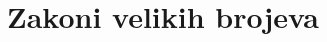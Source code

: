 \documentclass[a4paper,twoside,12pt]{report}
\begin{document}
    


    


    


    \part{Zakoni velikih brojeva}



    
    
\end{document}
